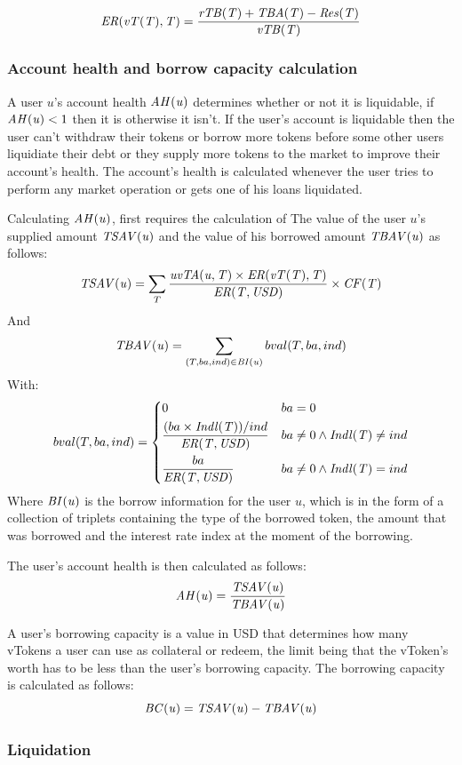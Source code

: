 $$
  \mathit{ER(\mathit{vT(T)}, T)} = \frac{\mathit{rTB(T)} + \mathit{TBA(T)} - \mathit{Res(T)}}{\mathit{vTB(T)}}
$$

\subsubsection{Account health and borrow capacity calculation}

A user $u$'s account health $\mathit{AH(u)}$ determines whether or not it is liquidable, if $\mathit{AH(u)} < 1$ then it is otherwise it isn't. If the user's account is liquidable then the user can't withdraw their tokens or borrow more tokens before some other users liquidiate their debt or they supply more tokens to the market to improve their account's health. The account's health is calculated whenever the user tries to perform any market operation or gets one of his loans liquidated.

Calculating $\mathit{AH(u)}$, first requires the calculation of The value of the user $u$'s supplied amount $\mathit{TSAV(u)}$ and the value of his borrowed amount $\mathit{TBAV(u)}$ as follows:
$$
  \mathit{TSAV(u)} = \sum_{T} \frac{\mathit{uvTA(u, T)} \times \mathit{ER(\mathit{vT(T)}, T)}}{\mathit{ER(T, \mathit{USD})}} \times \mathit{CF(T)}
$$
And
$$
  \mathit{TBAV(u)} = \sum_{(T, ba, ind) \in \mathit{BI(u)}} bval(T, ba, ind)
$$
With: 
$$
bval(T, ba, ind) = 
\begin{dcases}
  0 & ba = 0\\
  \frac{(ba \times \mathit{Indl(T)})/ ind}{\mathit{ER(T, \mathit{USD})}} & ba \neq 0 \wedge \mathit{Indl(T)} \neq ind \\
  \frac{ba}{\mathit{ER(T, \mathit{USD})}} & ba \neq 0 \wedge \mathit{Indl(T)} = ind
\end{dcases}
$$
Where $\mathit{BI(u)}$ is the borrow information for the user $u$, which is in the form of a collection of triplets containing the type of the borrowed token, the amount that was borrowed and the interest rate index at the moment of the borrowing. 

The user's account health is then calculated as follows:
$$
  \mathit{AH(u)} = \frac{\mathit{TSAV(u)}}{\mathit{TBAV(u)}}
$$


A user's borrowing capacity is a value in USD that determines how many vTokens a user can use as collateral or redeem, the limit being that the vToken's worth has to be less than the user's borrowing capacity. The borrowing capacity is calculated as follows:
$$
  \mathit{BC(u)} = \mathit{TSAV(u)} - \mathit{TBAV(u)}
$$

\subsubsection{Liquidation}

